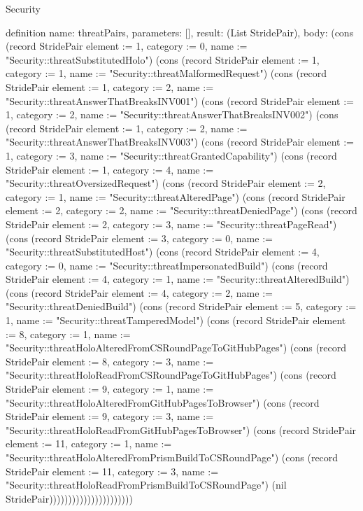 \begin{lexlean}{Security}
\begin{semanticmodule}
definition{
  name: threatPairs,
  parameters: [],
  result: (List StridePair),
  body: (cons (record StridePair {element := 1, category := 0, name := "Security::threatSubstitutedHolo"}) (cons (record StridePair {element := 1, category := 1, name := "Security::threatMalformedRequest"}) (cons (record StridePair {element := 1, category := 2, name := "Security::threatAnswerThatBreaksINV001"}) (cons (record StridePair {element := 1, category := 2, name := "Security::threatAnswerThatBreaksINV002"}) (cons (record StridePair {element := 1, category := 2, name := "Security::threatAnswerThatBreaksINV003"}) (cons (record StridePair {element := 1, category := 3, name := "Security::threatGrantedCapability"}) (cons (record StridePair {element := 1, category := 4, name := "Security::threatOversizedRequest"}) (cons (record StridePair {element := 2, category := 1, name := "Security::threatAlteredPage"}) (cons (record StridePair {element := 2, category := 2, name := "Security::threatDeniedPage"}) (cons (record StridePair {element := 2, category := 3, name := "Security::threatPageRead"}) (cons (record StridePair {element := 3, category := 0, name := "Security::threatSubstitutedHost"}) (cons (record StridePair {element := 4, category := 0, name := "Security::threatImpersonatedBuild"}) (cons (record StridePair {element := 4, category := 1, name := "Security::threatAlteredBuild"}) (cons (record StridePair {element := 4, category := 2, name := "Security::threatDeniedBuild"}) (cons (record StridePair {element := 5, category := 1, name := "Security::threatTamperedModel"}) (cons (record StridePair {element := 8, category := 1, name := "Security::threatHoloAlteredFromCSRoundPageToGitHubPages"}) (cons (record StridePair {element := 8, category := 3, name := "Security::threatHoloReadFromCSRoundPageToGitHubPages"}) (cons (record StridePair {element := 9, category := 1, name := "Security::threatHoloAlteredFromGitHubPagesToBrowser"}) (cons (record StridePair {element := 9, category := 3, name := "Security::threatHoloReadFromGitHubPagesToBrowser"}) (cons (record StridePair {element := 11, category := 1, name := "Security::threatHoloAlteredFromPrismBuildToCSRoundPage"}) (cons (record StridePair {element := 11, category := 3, name := "Security::threatHoloReadFromPrismBuildToCSRoundPage"}) (nil StridePair))))))))))))))))))))))
}


\end{semanticmodule}
\end{lexlean}
